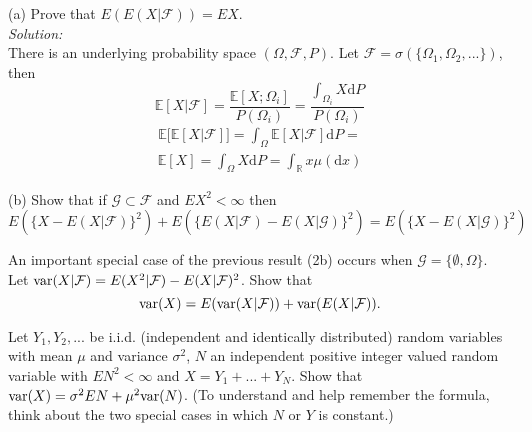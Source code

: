 \documentclass[10pt]{amsart}
\newcommand{\D}{\mathrm{d}}
\begin{document}
 (a) Prove that $E(E(X|\mathcal{F}))=EX$. \\
\textit{Solution:} \\
There is an underlying probability space $(\Omega, \mathcal F, P)$.
Let $\mathcal F = \sigma(\{\Omega_1, \Omega_2, ...\})$, then
$$
\mathbb E[X |\mathcal F]
	= \frac{\mathbb E [X; \Omega_i]}{P(\Omega_i)}
	= \frac{\int_{\Omega_i}  X \D P}{P(\Omega_i)}
$$
\begin{align*}
\mathbb E \big[ \mathbb E [X | \mathcal F]\big] = \int_\Omega \mathbb E [X | \mathcal F] \D P =
\end{align*}
\begin{align*}
\mathbb E[X] = \int_\Omega X \D P = \int_{\mathbb R} x \mu(\D x)
\end{align*}

\noindent
(b) Show that if $\mathcal{G}\subset \mathcal{F}$ and $EX^2<\infty$ then
$$E(\{X-E(X|\mathcal{F})\}^2)+ E(\{E(X|\mathcal{F})-E(X|\mathcal{G})\}^2)=E(\{X-E(X|\mathcal{G})\}^2)$$ 

 An important special case of the previous result (2b) occurs when $\mathcal{G} = \{\emptyset, \Omega \}$.  Let ${\rm var}(X|\mathcal{F})=E(X^2|\mathcal{F})-E(X|\mathcal{F})^2$. Show that 
$${\rm var}(X)=E({\rm var}(X|\mathcal{F}))+{\rm var}(E(X|\mathcal{F})).$$


  Let $Y_1, Y_2, . . .$ be i.i.d. (independent and identically distributed) random variables with mean $\mu$ and variance $\sigma^2$, $N$ an independent positive integer valued random variable with $EN^2 < \infty$ and $X = Y_1 +...+Y_N$. Show that ${\rm var}(X) = \sigma^2 EN + \mu^2 {\rm var}(N)$. (To understand and help remember the formula, think about the two special cases in which $N$ or $Y$ is constant.)
\end{document}
